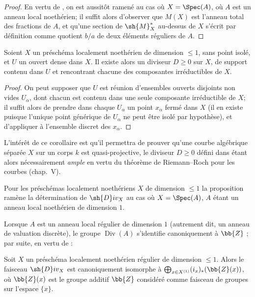 \begin{proof}
En vertu de , on est aussitôt ramené au cas où $X=\Spec(A)$, où $A$ est un anneau local noethérien;
il suffit alors d'observer que $M(X)$ est l'anneau total des fractions de $A$, et qu'une section de $\sh{M}^*_X$ au-dessus de $X$ s'écrit par définition comme quotient $b/a$ de deux éléments réguliers de $A$.
\end{proof}

\begin{corollary}[21.9.7]
\label{IV.21.9.7}
Soient $X$ un préschéma localement noethérien de dimension $\leq1$, sans point isolé, et $U$ un ouvert dense dans $X$.
Il existe alors un diviseur $D\geq0$ sur $X$, de support contenu dans $U$ et rencontrant chacune des composantes irréductibles de $X$.
\end{corollary}

\begin{proof}
On peut supposer que $U$ est réunion d'ensembles ouverts disjoints non vides $U_\alpha$, dont chacun est contenu dans une seule composante irréductible de $X$;
il suffit alors de prendre dans chaque $U_\alpha$ un point $x_\alpha$ fermé dans $X$ (il en existe puisque l'unique point générique de $U_\alpha$ ne peut être isolé par hypothèse), et d'appliquer  à l'ensemble discret des $x_\alpha$.
\end{proof}

L'intérêt de ce corollaire est qu'il permettra de prouver qu'une courbe algébrique séparée $X$ sur un corps $k$ est quasi-projective, le diviseur $D\geq0$ défini dans  étant alors nécessairement \emph{ample} en vertu du théorème de Riemann--Roch pour les courbes (chap.~V).

\begin{env}[21.9.8]
\label{IV.21.9.8}
Pour les préschémas localement noethériens $X$ de dimension $\leq1$ la proposition  ramène la détermination de $\sh{D}iv_X$ au cas où $X=\Spec(A)$, $A$ étant un anneau local noethérien de dimension $1$.

Lorsque $A$ est un anneau local régulier de dimension $1$ (autrement dit, un anneau de valuation discrète), le groupe $\operatorname{Div}(A)$ s'identifie canoniquement à $\bb{Z}$ ;
par suite, en vertu de :
\end{env}

\begin{proposition}[21.9.9]
\label{IV.21.9.9}
Soit $X$ un préschéma localement noethérien régulier de dimension $\leq1$.
Alors le faisceau $\sh{D}iv_X$ est canoniquement isomorphe à $\bigoplus_{x\in X^{(1)}}(i_x)_*(\bb{Z}(x))$, où $\bb{Z}(x)$ est le groupe additif $\bb{Z}$ considéré comme faisceau de groupes sur l'espace $\{x\}$.
\end{proposition}


